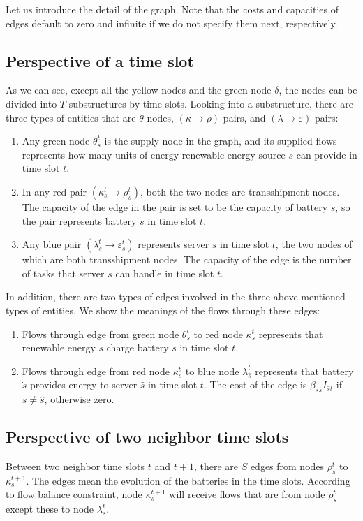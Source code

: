 \documentclass[conference, 10pt, ﬁnal, letterpaper, twocolumn]{IEEEtran}
\begin{document}
Let us introduce the detail of the graph. Note that the costs and capacities of edges default to zero and infinite if we do not specify them next, respectively. 

\subsection{Perspective of a time slot}

As we can see, except all the yellow nodes and the green node $\delta$, the nodes can be divided into $T$ substructures by time slots. Looking into a substructure, there are three types of entities that are $\theta$-nodes, $(\kappa\rightarrow\rho)$-pairs, and $(\lambda\rightarrow\varepsilon)$-pairs:
\begin{enumerate}
    \item Any green node $\theta^{t}_{s}$ is the supply node in the graph, and its supplied flows represents how many units of energy renewable energy source $s$ can provide in time slot $t$.
    \item In any red pair $(\kappa^{t}_{s}\rightarrow\rho^{t}_{s})$, both the two nodes are transshipment nodes. The capacity of the edge in the pair is set to be the capacity of battery $s$, so the pair represents battery $s$ in time slot $t$.
    \item Any blue pair $(\lambda^{t}_{s}\rightarrow\varepsilon^{t}_{s})$ represents server $s$ in time slot $t$, the two nodes of which are both transshipment nodes. The capacity of the edge is the number of tasks that server $s$ can handle in time slot $t$.
\end{enumerate}

In addition, there are two types of edges involved in the three above-mentioned types of entities. We show the meanings of the flows through these edges:
\begin{enumerate}
    \item Flows through edge from green node $\theta^{t}_{s}$ to red node $\kappa^{t}_{s}$ represents that renewable energy $s$ charge battery $s$ in time slot $t$.
    \item Flows through edge from red node $\kappa^{t}_{\dot{s}}$ to blue node $\lambda^{t}_{\hat{s}}$ represents that battery $\dot{s}$ provides energy to server $\hat{s}$ in time slot $t$. The cost of the edge is $\beta_{\dot{s}\hat{s}}I_{\hat{s}t}$ if $\dot{s}\neq\hat{s}$, otherwise zero.
\end{enumerate}

\subsection{Perspective of two neighbor time slots}
Between two neighbor time slots $t$ and $t+1$, there are $S$ edges from nodes $\rho^{t}_{s}$ to $\kappa^{t+1}_{s}$. The edges mean the evolution of the batteries in the time slots. According to flow balance constraint, node $\kappa^{t+1}_{s}$ will receive flows that are from node $\rho^{t}_{s}$ except these to node $\lambda^{t}_{s}$. 
\end{document}
